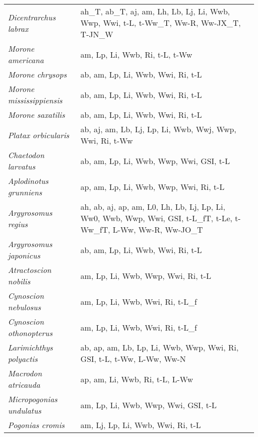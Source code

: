 {\begin{longtable}[c]{p{3.5cm}p{5.5cm}p{5.5cm}}
\emph{Dicentrarchus labrax} &  ah\_T, ab\_T, aj, am, Lh, Lb, Lj, Li, Wwb, Wwp, Wwi, t-L, t-Ww\_T, Ww-R, Ww-JX\_T, T-JN\_W & \citet{LikaKooy2014,Papa2012,Anon2008,LikaPavl2015,PapaLika2014,MayeShac1990,PersMahe2004,Zanu1985} \\
\emph{Morone americana} &  am, Lp, Li, Wwb, Ri, t-L, t-Ww & \citet{Krug1965} \\
\emph{Morone chrysops} &  ab, am, Lp, Li, Wwb, Wwi, Ri, t-L &  \\
\emph{Morone mississippiensis} &  ab, am, Lp, Li, Wwb, Wwi, Ri, t-L & \citet{MontHoud1990,Zerv2010} \\
\emph{Morone saxatilis} &  ab, am, Lp, Li, Wwb, Wwi, Ri, t-L &  \\
\emph{Platax orbicularis} &  ab, aj, am, Lb, Lj, Lp, Li, Wwb, Wwj, Wwp, Wwi, Ri, t-Ww & \citet{RemoMaam2012} \\
\emph{Chaetodon larvatus} &  ab, am, Lp, Li, Wwb, Wwp, Wwi, GSI, t-L & \citet{Zeke2003,ZekeWeer2006,Leis1989} \\
\emph{Aplodinotus grunniens} &  ap, am, Lp, Li, Wwb, Wwp, Wwi, Ri, t-L &  \\
\emph{Argyrosomus regius} &  ah, ab, aj, ap, am, L0, Lh, Lb, Lj, Lp, Li, Ww0, Wwb, Wwp, Wwi, GSI, t-L\_fT, t-Le, t-Ww\_fT, L-Ww, Ww-R, Ww-JO\_T & \citet{LikaKooy2014,KlimoPagou2013,PapaKent2013,Papa2013,VargasRuiz2014,MyloMitri2013,KirSunar2017} \\
\emph{Argyrosomus japonicus} &  ab, am, Lp, Li, Wwb, Wwi, Ri, t-L & \citet{LikaKooy2014,SilbGray2009} \\
\emph{Atractoscion nobilis} &  am, Lp, Li, Wwb, Wwp, Wwi, Ri, t-L & \citet{RomoHerz2015,Anon2001} \\
\emph{Cynoscion nebulosus} &  am, Lp, Li, Wwb, Wwi, Ri, t-L\_f & \citet{Bort2003,NielThom2002,SmitMont2008} \\
\emph{Cynoscion othonopterus} &  am, Lp, Li, Wwb, Wwi, Ri, t-L\_f & \citet{Bort2003,Arag2014} \\
\emph{Larimichthys polyactis} &  ab, ap, am, Lb, Lp, Li, Wwb, Wwp, Wwi, Ri, GSI, t-L, t-Ww, L-Ww, Ww-N & \citet{ZhanLou2016,LimLe2010,MasuAmao1984,YanLiu2014,JianZhan2018,LiShan2011,MaYan2017,YanLi2006,Shui2000,ZhanLi2010} \\
\emph{Macrodon atricauda} &  ap, am, Li, Wwb, Ri, t-L, L-Ww & \citet{CardHaim2011} \\
\emph{Micropogonias undulatus} &  am, Lp, Li, Wwb, Wwp, Wwi, GSI, t-L & \citet{BarbCit1994,HaleReit1992} \\
\emph{Pogonias cromis} &  am, Lj, Lp, Li, Wwb, Wwi, Ri, t-L & \citet{Rich2005,OlseMcDo2018} \\

\end{longtable}}
